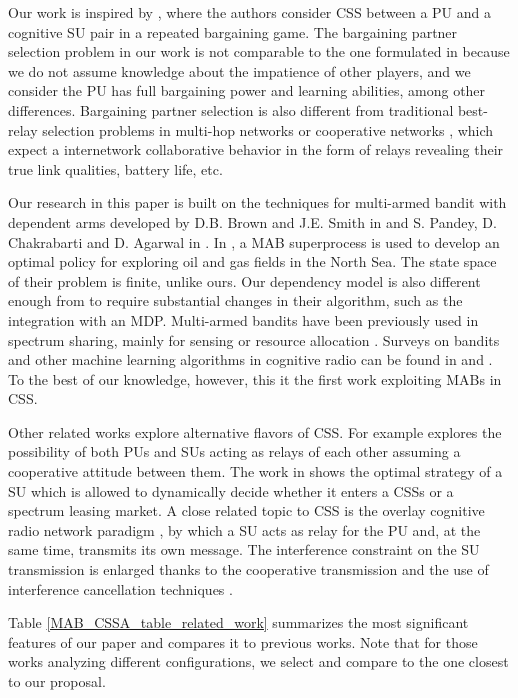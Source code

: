 Our work is inspired by \cite{ref:Yan2013}, where the authors consider CSS between a PU and a cognitive SU pair in a repeated bargaining game. 
The bargaining partner selection problem in our work is not comparable to the one formulated in \cite{ref:Calvo2002} because we do not assume knowledge about the impatience of other players, and we consider the PU has full bargaining power and learning abilities, among other differences. 
Bargaining partner selection is also different from traditional best-relay selection problems in multi-hop networks or cooperative networks \cite{ref:Yuan2013,ref:Tran2014}, which expect a internetwork collaborative behavior in the form of relays revealing their true link qualities, battery life, etc.

Our research in this paper is built on the techniques for multi-armed bandit with dependent arms developed by D.B. Brown and J.E. Smith in \cite{ref:Brown2013} and S. Pandey, D. Chakrabarti and D. Agarwal in \cite{ref:Pandey2007}. In \cite{ref:Brown2013}, a MAB superprocess is used to develop an optimal policy for exploring oil and gas fields in the North Sea. The state space of their problem is finite, unlike ours. 
Our dependency model is also different enough from \cite{ref:Pandey2007} to require substantial changes in their algorithm, such as the integration with an MDP. 
Multi-armed bandits have been previously used in spectrum sharing, mainly for sensing or resource allocation \cite{ref:Si2010}. 
Surveys on bandits and other machine learning algorithms in cognitive radio can be found in \cite{ref:Bkassiny2013} and \cite{ref:Gavrilovska2013}.
To the best of our knowledge, however, this it the first work exploiting MABs in CSS. 

Other related works explore alternative flavors of CSS. For example \cite{ref:Tran2014} explores the possibility of both PUs and SUs acting as relays of each other assuming a cooperative attitude between them. 
The work in \cite{ref:Shao2014} shows the optimal strategy of a SU which is allowed to dynamically decide whether it enters a CSSs or a spectrum leasing market. A close related topic to CSS is the overlay cognitive radio network paradigm \cite{ref:Goldsmith2009}, by which a SU acts as relay for the PU and, at the same time, transmits its own message. 
The interference constraint on the SU transmission is enlarged thanks to the cooperative transmission and the use of interference cancellation techniques \cite{ref:Han2010}. 

Table \ref{MAB_CSSA_table_related_work} summarizes the most significant features of our paper and compares it to previous works. 
Note that for those works analyzing different configurations, we select and compare to the one closest to our proposal. 

